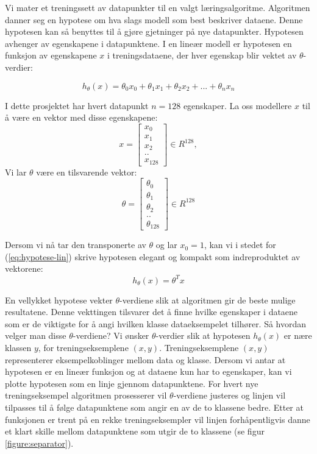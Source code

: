 {Vi mater et treningssett av datapunkter til en valgt læringsalgoritme. Algoritmen danner seg en hypotese om hva slags modell som best beskriver dataene. Denne hypotesen kan så benyttes til å gjøre gjetninger på nye datapunkter. Hypotesen avhenger av egenskapene i datapunktene. I en lineær modell er hypotesen en funksjon av egenskapene $x$ i treningsdataene, der hver egenskap blir vektet av $\theta$-verdier:

\begin{equation}
h_\theta(x) = \theta_0x_0 + \theta_1x_1 + \theta_2x_2 + ... + \theta_nx_n
\label{eq:hypotese-lin}
\end{equation}

I dette prosjektet har hvert datapunkt $n = 128$ egenskaper. La oss modellere $x$ til å være en vektor med disse egenskapene: 
\[
x =
\begin{bmatrix}
x_0 \\
x_1 \\
x_2 \\
.. \\
x_{128}
\end{bmatrix}
\in R^{128},
\]
Vi lar $\theta$ være en tilsvarende vektor: 
\[
\theta =
\begin{bmatrix}
\theta_0 \\
\theta_1 \\
\theta_2 \\
.. \\
\theta_{128}
\end{bmatrix}
\in R^{128}
\]

Dersom vi nå tar den transponerte av $\theta$ og lar \(x_0 = 1\), kan vi i stedet for (\ref{eq:hypotese-lin}) skrive hypotesen elegant og kompakt som indreproduktet av vektorene:
\begin{equation}
h_\theta(x) = \theta^{T}x
\label{eq:hypotese-kompakt}
\end{equation}

En vellykket hypotese vekter $\theta$-verdiene slik at algoritmen gir de beste mulige resultatene. Denne vekttingen tilsvarer det å finne hvilke egenskaper i dataene som er de viktigste for å angi hvilken klasse dataeksempelet tilhører. Så hvordan velger man disse $\theta$-verdiene? Vi ønsker $\theta$-verdier slik at hypotesen \(h_\theta(x)\) er nære klassen $y$, for treningseksemplene \((x,y)\). Treningseksemplene  \((x,y)\) representerer eksempelkoblinger mellom data og klasse. Dersom vi antar at hypotesen er en lineær funksjon og at dataene kun har to egenskaper, kan vi plotte hypotesen som en linje gjennom datapunktene. For hvert nye treningseksempel algoritmen prosesserer vil $\theta$-verdiene justeres og linjen vil tilpasses til å følge datapunktene som angir en av de to klassene bedre. Etter at funksjonen er trent på en rekke treningseksempler vil linjen forhåpentligvis danne et klart skille mellom datapunktene som utgir de to klassene (se figur \ref{figure:separator}).

}
